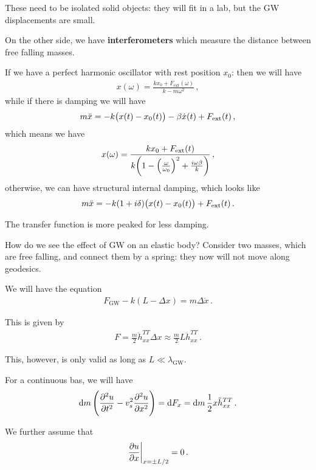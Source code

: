 \documentclass[main.tex]{subfiles}
\begin{document}
These need to be isolated solid objects: they will fit in a lab, but the GW displacements are small. 

On the other side, we have \textbf{interferometers} which measure the distance between free falling masses. 

If we have a perfect harmonic oscillator with rest position \(x_0 \): then we will have 
%
\begin{align}
x(\omega ) = \frac{k x_0 + F _{\text{ext}}(\omega )}{k - m \omega^2}
\,,
\end{align}
%
while if there is damping we will have 
%
\begin{align}
m \ddot{x} = - k \qty(x(t) - x_0 (t)) - \beta \dot{x}(t) + F _{\text{ext}}(t)
\,,
\end{align}
%
which means we have 
%
\begin{align}
x(\omega ) = \frac{k x_0 + F _{\text{ext}}(t)}{k \qty(1 - \qty( \frac{\omega}{\omega_0 })^2 + \frac{i \omega \beta }{k})}
\,,
\end{align}
%
otherwise, we can have structural internal damping, which looks like 
%
\begin{align}
m \ddot{x} = - k (1 + i \delta ) \qty(x(t) - x_0 (t)) + F _{\text{ext}}(t)
\,.
\end{align}

The transfer function is more peaked for less damping. 

How do we see the effect of GW on an elastic body? Consider two masses, which are free falling, and connect them by a spring: they now will not move along geodesics.

We will have the equation 
%
\begin{align}
F _{\text{GW}} - k (L - \Delta x) = m \Delta \ddot{x}
\,.
\end{align}

This is given by 
%
\begin{align}
F = \frac{m}{2} \ddot{h}^{TT}_{xx} \Delta x \approx \frac{m}{2} L \ddot{h}^{TT}_{xx}
\,.
\end{align}

This, however, is only valid as long as \(L \ll \lambda _{\text{GW}}\). 

For a continuous bas, we will have 
%
\begin{align}
\dd{m} \qty(\pdv[2]{u}{t} - v_s^2 \pdv[2]{u}{x}) = \dd{F_x} = \dd{m} \frac{1}{2} x \ddot{h}_{xx}^{TT}
\,.
\end{align}
%

We further assume that 
%
\begin{align}
\eval{\pdv{u}{x}}_{x = \pm L/2} = 0
\,.
\end{align}
\end{document}
